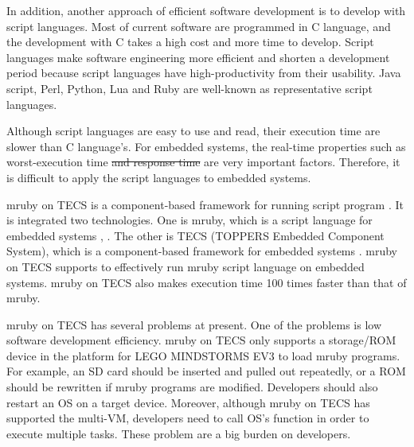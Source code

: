 \documentclass[conference,compsoc]{IEEEtran}
\providecommand{\DIFadd}[1]{{\protect\color{blue}\uwave{#1}}} %
\providecommand{\DIFdel}[1]{{\protect\color{red}\sout{#1}}}                      %
\providecommand{\DIFaddbegin}{} %
\providecommand{\DIFaddend}{} %
\providecommand{\DIFdelbegin}{} %
\providecommand{\DIFdelend}{} %
\begin{document}
In addition, another approach of efficient software development is to develop with script languages.
Most of current software are programmed in C language, and the development with C takes a high cost and more time to develop.
Script languages make software engineering more efficient and shorten a development period because script languages have high-productivity from their usability.
Java script, Perl, Python, Lua and Ruby are well-known as representative script languages.

Although script languages are easy to use and read, their execution time are slower than C language's.
For embedded systems, the real-time properties such as \DIFaddbegin \DIFadd{estimation of }\DIFaddend worst-execution time \DIFdelbegin \DIFdel{and response time }\DIFdelend are very important factors.
Therefore, it is difficult to apply the script languages to embedded systems.

mruby on TECS is a component-based framework for running script program \cite{par:mrubyonTECS}.
It is integrated two technologies.
One is mruby, which is a script language for embedded systems \cite{par:mruby}, \cite{url:mruby}.
The other is TECS (TOPPERS Embedded Component System), which is a component-based framework for embedded systems \cite{par:TECS} \cite{url:TOPPERS}.
mruby on TECS supports to effectively run mruby script language on embedded systems.
mruby on TECS also makes execution time 100 times faster than that of mruby.

mruby on TECS has several problems at present.
One of the problems is low software development efficiency.
mruby on TECS only supports a storage/ROM device in the platform for LEGO MINDSTORMS EV3 \cite{par:EV3} to load mruby programs.
For example, an SD card should be inserted and pulled out repeatedly, or a ROM should be rewritten if mruby programs are modified.
Developers should also restart an OS on a target device.
Moreover, although mruby on TECS has supported the multi-VM, developers need to call OS's function in order to execute multiple tasks.
These problem are a big burden on developers.
\end{document}
